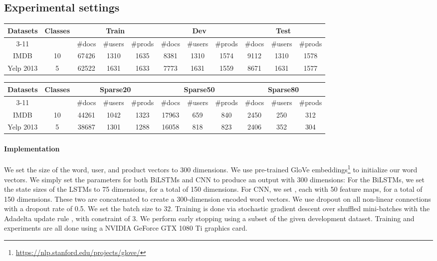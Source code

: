 \documentclass[11pt,a4paper]{article}
\begin{document}
\subsection{Experimental settings}

\begin{table*}[t]
  \small
  \centering
    \begin{tabular}{|c|c|ccc|ccc|ccc|}
    \hline
    \multirow{2}[1]{*}{Datasets} & \multirow{2}[1]{*}{Classes} & \multicolumn{3}{c|}{Train} & \multicolumn{3}{c|}{Dev} & \multicolumn{3}{c|}{Test} \\
\cline{3-11}     &  & \#docs & \#users & \#prods & \#docs & \#users & \#prods & \#docs & \#users & \#prods \\
    \hline
    IMDB & 10 & 67426 & 1310 & 1635 & 8381 & 1310 & 1574 & 9112 & 1310 & 1578 \\
    Yelp 2013 & 5 & 62522 & 1631 & 1633 & 7773 & 1631 & 1559 & 8671 & 1631 & 1577 \\
    \hline
    \end{tabular}
    
    \begin{tabular}{|c|c|ccc|ccc|ccc|}
    \hline
    \multirow{2}[1]{*}{Datasets} & \multirow{2}[1]{*}{Classes} & \multicolumn{3}{c|}{Sparse20} & \multicolumn{3}{c|}{Sparse50} & \multicolumn{3}{c|}{Sparse80} \\
\cline{3-11}     &  & \#docs & \#users & \#prods & \#docs & \#users & \#prods & \#docs & \#users & \#prods \\
    \hline
    IMDB & 10 & 44261 & 1042 & 1323 & 17963 & 659 & 840 & 2450 & 250 & 312 \\
    Yelp 2013 & 5 & 38687 & 1301 & 1288 & 16058 & 818 & 823 & 2406 & 352 & 304 \\
    \hline
    \end{tabular}\caption{Dataset statistics}
  \label{tab:data}\end{table*}

\paragraph{Implementation}

We set the size of the word, user, and product vectors to 300 dimensions. We use pre-trained GloVe embeddings\footnote{\url{https://nlp.stanford.edu/projects/glove/}} \cite{pennington2014glove} to initialize our word vectors.
We simply set the parameters for both BiLSTMs and CNN to produce an output with 300 dimensions:
For the BiLSTMs, we set the state sizes of the LSTMs to 75 dimensions, for a total of 150 dimensions. For CNN, we set , each with 50 feature maps, for a total of 150 dimensions.
These two are concatenated to create a 300-dimension encoded word vectors. We use dropout \cite{srivastava2014dropout} on all non-linear connections with a dropout rate of 0.5. 
We set the batch size to 32.
Training is done via stochastic gradient descent over shuffled mini-batches with the Adadelta update rule \cite{Zeiler2012ADADELTAAA}, with  constraint \cite{Hinton2012ImprovingNN} of 3. We perform early stopping using a subset of the given development dataset. Training and experiments are all done using a NVIDIA GeForce GTX 1080 Ti graphics card.
\end{document}
